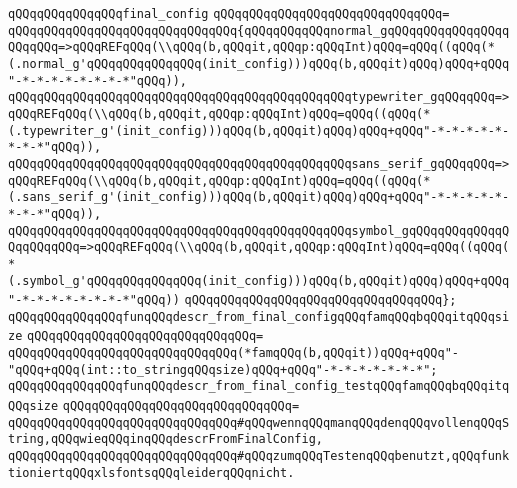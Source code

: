 \verb|qQQqqQQqqQQqqQQqfinal_config|\newline
\verb|qQQqqQQqqQQqqQQqqQQqqQQqqQQqqQQq=|\newline
\verb|qQQqqQQqqQQqqQQqqQQqqQQqqQQqqQQq{qQQqqQQqqQQqnormal_gqQQqqQQqqQQqqQQqqQQqqQQq=>qQQqREFqQQq(\\qQQq(b,qQQqit,qQQqp:qQQqInt)qQQq=qQQq((qQQq(*(.normal_g'qQQqqQQqqQQqqQQq(init_config)))qQQq(b,qQQqit)qQQq)qQQq+qQQq"-*-*-*-*-*-*-*-*"qQQq)),|\newline
\verb|qQQqqQQqqQQqqQQqqQQqqQQqqQQqqQQqqQQqqQQqqQQqqQQqtypewriter_gqQQqqQQq=>qQQqREFqQQq(\\qQQq(b,qQQqit,qQQqp:qQQqInt)qQQq=qQQq((qQQq(*(.typewriter_g'(init_config)))qQQq(b,qQQqit)qQQq)qQQq+qQQq"-*-*-*-*-*-*-*-*"qQQq)),|\newline
\verb|qQQqqQQqqQQqqQQqqQQqqQQqqQQqqQQqqQQqqQQqqQQqqQQqsans_serif_gqQQqqQQq=>qQQqREFqQQq(\\qQQq(b,qQQqit,qQQqp:qQQqInt)qQQq=qQQq((qQQq(*(.sans_serif_g'(init_config)))qQQq(b,qQQqit)qQQq)qQQq+qQQq"-*-*-*-*-*-*-*-*"qQQq)),|\newline
\verb|qQQqqQQqqQQqqQQqqQQqqQQqqQQqqQQqqQQqqQQqqQQqqQQqsymbol_gqQQqqQQqqQQqqQQqqQQqqQQq=>qQQqREFqQQq(\\qQQq(b,qQQqit,qQQqp:qQQqInt)qQQq=qQQq((qQQq(*(.symbol_g'qQQqqQQqqQQqqQQq(init_config)))qQQq(b,qQQqit)qQQq)qQQq+qQQq"-*-*-*-*-*-*-*-*"qQQq))|\newline
\verb|qQQqqQQqqQQqqQQqqQQqqQQqqQQqqQQqqQQq};|\newline
\newline
\newline
\verb|qQQqqQQqqQQqqQQqfunqQQqdescr_from_final_configqQQqfamqQQqbqQQqitqQQqsize|\newline
\verb|qQQqqQQqqQQqqQQqqQQqqQQqqQQqqQQq=|\newline
\verb|qQQqqQQqqQQqqQQqqQQqqQQqqQQqqQQq(*famqQQq(b,qQQqit))qQQq+qQQq"-"qQQq+qQQq(int::to_stringqQQqsize)qQQq+qQQq"-*-*-*-*-*-*-*";|\newline
\newline
\verb|qQQqqQQqqQQqqQQqfunqQQqdescr_from_final_config_testqQQqfamqQQqbqQQqitqQQqsize|\newline
\verb|qQQqqQQqqQQqqQQqqQQqqQQqqQQqqQQq=|\newline
\verb|qQQqqQQqqQQqqQQqqQQqqQQqqQQqqQQq#qQQqwennqQQqmanqQQqdenqQQqvollenqQQqString,qQQqwieqQQqinqQQqdescrFromFinalConfig,|\newline
\verb|qQQqqQQqqQQqqQQqqQQqqQQqqQQqqQQq#qQQqzumqQQqTestenqQQqbenutzt,qQQqfunktioniertqQQqxlsfontsqQQqleiderqQQqnicht.|\newline
